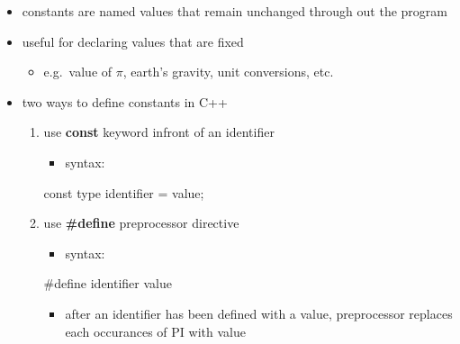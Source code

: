 \documentclass[11pt]{article}
\providecommand{\tightlist}{%
      \setlength{\itemsep}{0pt}\setlength{\parskip}{0pt}}
\newenvironment{Shaded}{}{}
\newcommand{\NormalTok}[1]{{#1}}
\newcommand{\OperatorTok}[1]{\textcolor[rgb]{0.40,0.40,0.40}{{#1}}}
\newcommand{\PreprocessorTok}[1]{\textcolor[rgb]{0.74,0.48,0.00}{{#1}}}
\newcommand{\AttributeTok}[1]{\textcolor[rgb]{0.49,0.56,0.16}{{#1}}}
\begin{document}
\begin{itemize}
\tightlist
\item
  constants are named values that remain unchanged through out the
  program
\item
  useful for declaring values that are fixed

  \begin{itemize}
  \tightlist
  \item
    e.g.~value of \(\pi\), earth's gravity, unit conversions, etc.
  \end{itemize}
\item
  two ways to define constants in C++

  \begin{enumerate}
  \def\labelenumi{\arabic{enumi}.}
  \tightlist
  \item
    use \textbf{const} keyword infront of an identifier

    \begin{itemize}
    \tightlist
    \item
      syntax:
    \end{itemize}

\begin{Shaded}
\begin{Highlighting}[]
\AttributeTok{const}\NormalTok{ type identifier }\OperatorTok{=}\NormalTok{ value}\OperatorTok{;}
\end{Highlighting}
\end{Shaded}
  \item
    use \textbf{\#define} preprocessor directive

    \begin{itemize}
    \tightlist
    \item
      syntax:
    \end{itemize}

\begin{Shaded}
\begin{Highlighting}[]
\PreprocessorTok{\#define identifier }\NormalTok{value}
\end{Highlighting}
\end{Shaded}

    \begin{itemize}
    \tightlist
    \item
      after an identifier has been defined with a value, preprocessor
      replaces each occurances of PI with value
    \end{itemize}
  \end{enumerate}
\end{itemize}
\end{document}
